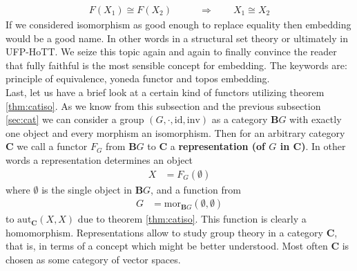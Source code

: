 \begin{align*}
  F(X_{1})
  \cong
  F(X_{2})
  \qquad
  &\Rightarrow
  \qquad
  X_{1}
  \cong
  X_{2}
\end{align*}
If we considered isomorphism as good enough to replace equality then embedding would be a good name. In other words in a structural set theory or ultimately in UFP-HoTT. We seize this topic again and again to finally convince the reader that fully faithful is the most sensible concept for embedding. The keywords are: principle of equivalence, yoneda functor and topos embedding.
\\
Last, let us have a brief look at a certain kind of functors utilizing theorem \ref{thm:catiso}. As we know from this subsection and the previous subsection \ref{sec:cat} we can consider a group $(G,\cdot,\mathrm{id},\mathrm{inv})$ as a category $\mathbf{B}G$ with exactly one object and every morphism an isomorphism. Then for an arbitrary category $\mathbf{C}$ we call a functor $F_{G}$ from $\mathbf{B}G$ to $\mathbf{C}$ a \textbf{representation (of $G$ in $\mathbf{C}$)}. In other words a representation determines an object
\begin{align*}
  X
  &=
  F_{G}(\emptyset)
\end{align*}
where $\emptyset$ is the single object in $\mathbf{B}G$, and a function from
\begin{align*}
  G
  &=
  \mathrm{mor}_{\mathbf{B}G}(\emptyset,\emptyset)
\end{align*}
to $\mathrm{aut}_{\mathbf{C}}(X,X)$ due to theorem \ref{thm:catiso}. This function is clearly a homomorphism. Representations allow to study group theory in a category $\mathbf{C}$, that is, in terms of a concept which might be better understood. Most often $\mathbf{C}$ is chosen as some category of vector spaces.
